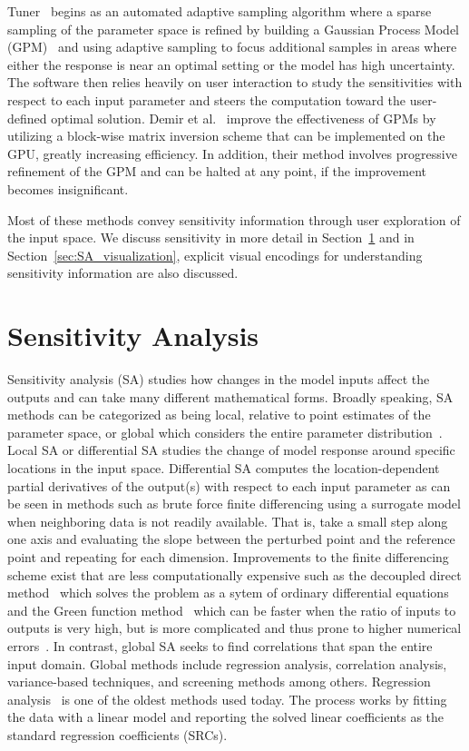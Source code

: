 Tuner~\cite{Torsney-WeirSaadMoller2011} begins as an automated adaptive sampling algorithm where a sparse sampling of the parameter space is refined by building a Gaussian Process Model (GPM)~\cite{RasmussenWilliams2006} and using adaptive sampling to focus additional samples in areas where either the response is near an optimal setting or the model has high uncertainty.
%
The software then relies heavily on user interaction to study the sensitivities with respect to each input parameter and steers the computation toward the user-defined optimal solution.
%
Demir et al.~\cite{DemirWestermann2013} improve the effectiveness of GPMs by utilizing a block-wise matrix inversion scheme that can be implemented on the GPU, greatly increasing efficiency.
%
In addition, their method involves progressive refinement of the GPM and can be halted at any point, if the improvement becomes insignificant.

Most of these methods convey sensitivity information through user exploration of the input space.
%
We discuss sensitivity in more detail in Section~\ref{sec:sensitivity} and in Section~\ref{sec:SA_visualization}, explicit visual encodings for understanding sensitivity information are also discussed.

\section{Sensitivity Analysis}
\label{sec:sensitivity}
Sensitivity analysis (SA) studies how changes in the model inputs affect the outputs and can take many different mathematical forms.
%
Broadly speaking, SA methods can be categorized as being local, relative to point estimates of the parameter space, or global which considers the entire parameter distribution~\cite{Hamby1995}.
%
Local SA or differential SA studies the change of model response around specific locations in the input space.
%
Differential SA computes the location-dependent partial derivatives of the output(s) with respect to each input parameter as can be seen in methods such as brute force finite differencing using a surrogate model when neighboring data is not readily available.
%
That is, take a small step along one axis and evaluating the slope between the perturbed point and the reference point and repeating for each dimension.
%
Improvements to the finite differencing scheme exist that are less computationally expensive such as the decoupled direct method~\cite{Dunker1981, Dunker1984} which solves the problem as a sytem of ordinary differential equations and the Green function method~\cite{KramerCaloRabitz1981} which can be faster when the ratio of inputs to outputs is very high, but is more complicated and thus prone to higher numerical errors~\cite{SaltelliChanScott2000}.
%
In contrast, global SA seeks to find correlations that span the entire input domain.
%
Global methods include regression analysis, correlation analysis, variance-based techniques, and screening methods among others.
%
Regression analysis~\cite{Galton1886} is one of the oldest methods used today.
%
The process works by fitting the data with a linear model and reporting the solved linear coefficients as the standard regression coefficients (SRCs).

